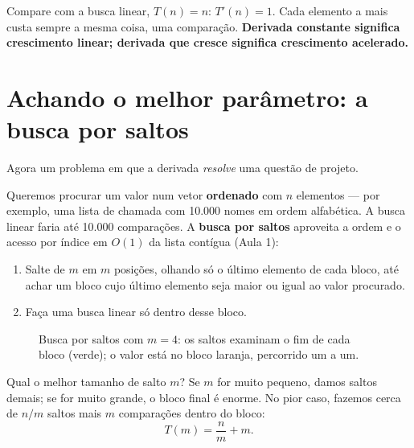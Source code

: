 Compare com a busca linear, $T(n) = n$: $T'(n) = 1$. Cada elemento a mais custa sempre a mesma
coisa, uma comparação. \textbf{Derivada constante significa crescimento linear; derivada que
cresce significa crescimento acelerado.}

\section{Achando o melhor parâmetro: a busca por saltos}

Agora um problema em que a derivada \emph{resolve} uma questão de projeto.

Queremos procurar um valor num vetor \textbf{ordenado} com $n$ elementos — por exemplo, uma
lista de chamada com 10.000 nomes em ordem alfabética. A busca linear faria até 10.000
comparações. A \textbf{busca por saltos} aproveita a ordem e o acesso por índice em $O(1)$ da
lista contígua (Aula 1):

\begin{enumerate}
  \item Salte de $m$ em $m$ posições, olhando só o último elemento de cada bloco, até achar um
        bloco cujo último elemento seja maior ou igual ao valor procurado.
  \item Faça uma busca linear só dentro desse bloco.
\end{enumerate}

\begin{figure}[!htb]
\centering
{}
\caption{Busca por saltos com $m = 4$: os saltos examinam o fim de cada bloco (verde); o valor
está no bloco laranja, percorrido um a um.}
\end{figure}

Qual o melhor tamanho de salto $m$? Se $m$ for muito pequeno, damos saltos demais; se for muito
grande, o bloco final é enorme. No pior caso, fazemos cerca de $n/m$ saltos mais $m$ comparações
dentro do bloco:
\[
T(m) = \frac{n}{m} + m.
\]

